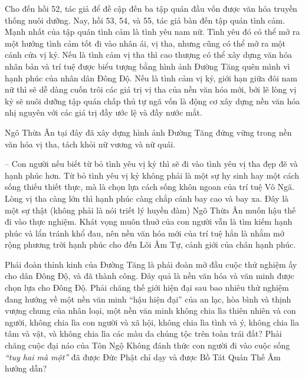 Cho đến hồi 52, tác giả để đề cập đến ba tập quán đầu vốn được văn hóa truyền thống nuôi dưỡng. Nay, hồi 53, 54, và 55, tác giả bàn đến tập quán tình cảm. Mạnh nhất của tập quán tình cảm là tình yêu nam nữ. Tình yêu đó có thể mở ra một hướng tình cảm tốt đi vào nhân ái, vị tha, nhưng cũng có thể mở ra một cánh cửa vị kỷ. Nếu là tình cảm vị tha thì cao thượng có thể xây dựng văn hóa nhân bản và trí tuệ được biểu tượng bằng hình ảnh Đường Tăng quên mình vì hạnh phúc của nhân dân Đông Độ. Nếu là tình cảm vị kỷ, giới hạn giữa đôi nam nữ thì sẽ dễ dàng cuốn trôi các giá trị vị tha của nền văn hóa mới, bởi lẽ lòng vị kỷ sẽ nuôi dưỡng tập quán chấp thủ tự ngã vốn là động cơ xây dựng nền văn hóa nhị nguyên với các giá trị đầy ước lệ và đầy nước mắt.

Ngô Thừa Ân tại đây đã xây dựng hình ảnh Đường Tăng đứng vững trong nền văn hóa vị tha, tách khỏi nữ vương và nữ quái.

-- Con người nếu biết từ bỏ tình yêu vị kỷ thì sẽ đi vào tình yêu vị tha đẹp đẽ và hạnh phúc hơn. Từ bỏ tình yêu vị kỷ không phải là một sự hy sinh hay một cách sống thiếu thiết thực, mà là chọn lựa cách sống khôn ngoan của trí tuệ Vô Ngã. Lòng vị tha càng lớn thì hạnh phúc càng chắp cánh bay cao và bay xa. Đây là một sự thật (không phải là nói triết lý huyền đàm) Ngô Thừa Ân muốn hậu thế đi vào thực nghiệm. Khát vọng muôn thuở của con người vẫn là tìm kiếm hạnh phúc và lẩn tránh khổ đau, nên nền văn hóa mới của trí tuệ hẳn là nhằm mở rộng phương trời hạnh phúc cho đến Lôi Âm Tự, cảnh giới của chân hạnh phúc.

Phái đoàn thỉnh kinh của Đường Tăng là phái đoàn mở đầu cuộc thử nghiệm ấy cho dân Đông Độ, và đã thành công. Đây quả là nền văn hóa và văn minh được chọn lựa cho Đông Độ. Phải chăng thế giới hiện đại sau bao nhiêu thử nghiệm đang hướng về một nền văn minh ``hậu hiện đại'' của an lạc, hòa bình và thịnh vượng chung của nhân loại, một nền văn minh không chia lìa thiên nhiên và con người, không chia lìa con người và xã hội, không chia lìa tình và ý, không chia lìa tâm và vật, và không chia lìa các màu da chủng tộc trên toàn trái đất? Phải chăng cuộc đại náo của Tôn Ngộ Không đánh thức con người đi vào cuộc sống \emph{``tuy hai mà một''} đã được Đức Phật chỉ dạy và được Bồ Tát Quán Thế Âm hướng dẫn?
